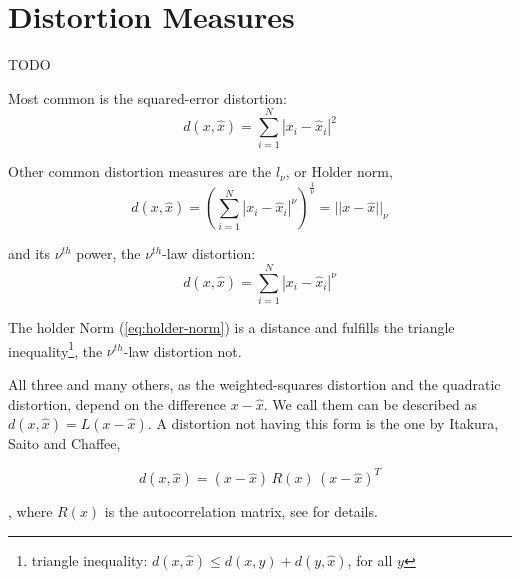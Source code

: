 \section{Distortion Measures}\label{sec:lvq-distortion-measures}
TODO

Most common is the squared-error distortion:
\begin{equation}
d(x, \hat{x}) = \sum_{i=1}^N |x_i - \hat{x}_i|^2
\end{equation}

Other common distortion measures are the $l_\nu$, or Holder norm,
\begin{equation}\label{eq:holder-norm}
d(x, \hat{x}) = \left( \sum_{i=1}^N |x_i - \hat{x}_i|^\nu \right) ^{\frac{1}{\nu}} = || x - \hat{x} ||_\nu
\end{equation}

and its $\nu^{th}$ power, the $\nu^{th}$-law distortion:
\begin{equation}
d(x, \hat{x}) = \sum_{i=1}^N |x_i - \hat{x}_i|^\nu
\end{equation}

The holder Norm (\ref{eq:holder-norm}) is a distance and fulfills the triangle inequality\footnote{triangle inequality: $d(x, \hat{x}) \leq d(x, y) + d(y, \hat{x})$, for all $y$}, the $\nu^{th}$-law distortion not.

All three and many others, as the weighted-squares distortion and the quadratic distortion, depend on the difference $x - \hat{x}$. We call them can be described as $d(x, \hat{x}) = L(x - \hat{x})$. A distortion not having this form is the one by Itakura, Saito and Chaffee,

\begin{equation}
d(x, \hat{x}) = (x - \hat{x})\, R(x)\, (x - \hat{x})^T
\end{equation}

, where $R(x)$ is the autocorrelation matrix, see \cite{Linde1980} for details.
